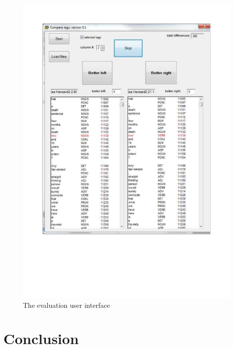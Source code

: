 \documentclass[output=paper]{langsci/langscibook}
\begin{document}
\begin{figure}[htbp]
  \includegraphics[width=\textwidth, clip, trim=20mm 60mm 20mm 20mm]{figures/fips-screenshot.pdf}
\caption{\label{figScreen}The evaluation user interface}
\end{figure}



\section{Conclusion}
\end{document}
